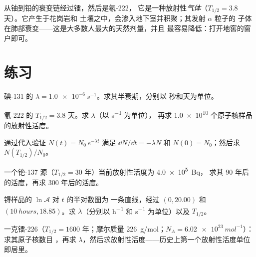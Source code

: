 \begin{remark}[衰变链与地窖中的气体]\label{rem:g12:radioactive-decay:radon}
从铀到铅的衰变链经过镭，然后是氡-222，
它是一种放射性\emph{气体}（$T_{1/2} = 3.8$ 天）。它产生于花岗岩和
土壤之中，会渗入地下室并积聚；其发射 $\alpha$ 粒子的
子体在肺部衰变——这是大多数人最大的天然剂量，并且
最容易降低：打开地窖的窗户即可。
\end{remark}

\section{练习}

\begin{exercise}[$\star$]\label{exo:g12:radioactive-decay:1}
碘-131 的 $\lambda = \qty{1.0e-6}{s^{-1}}$。求其半衰期，分别以
秒和天为单位。
\end{exercise}

\begin{exercise}[$\star$]\label{exo:g12:radioactive-decay:2}
氡-222 的 $T_{1/2} = 3.8$ 天。求 $\lambda$（以 \unit{s^{-1}} 为单位），
再求 \num{1.0e10} 个原子核样品的放射性活度。
\end{exercise}

\begin{exercise}[$\star$]\label{exo:g12:radioactive-decay:3}
通过代入验证 $N(t) = N_0\,e^{-\lambda t}$ 满足
$\dd N/\dd t = -\lambda N$ 和 $N(0) = N_0$；然后求 $N(T_{1/2})/N_0$。
\end{exercise}

\begin{exercise}[$\star$]\label{exo:g12:radioactive-decay:4}
一个铯-137 源（$T_{1/2} = 30$ 年）当前放射性活度为 \qty{4.0e5}{Bq}，
求其 $90$ 年后的活度，再求 $300$ 年后的活度。
\end{exercise}

\begin{exercise}[$\star$]\label{exo:g12:radioactive-decay:5}
锝样品的 $\ln \mathcal A$ 对 $t$ 的半对数图为
一条直线，经过 $(0, 20.00)$ 和 $(\qty{10}{hours}, 18.85)$。求
$\lambda$（分别以 \unit{h^{-1}} 和 \unit{s^{-1}} 为单位）以及 $T_{1/2}$。
\end{exercise}

\begin{exercise}[$\star\star$]\label{exo:g12:radioactive-decay:6}
一克镭-226（$T_{1/2} = 1600$ 年；摩尔质量
\qty{226}{g/mol}；$N_A = \qty{6.02e23}{mol^{-1}}$）：求其原子核数目
，再求 $\lambda$，然后求放射性活度——历史上第一个放射性活度单位
即居里。
\end{exercise}

